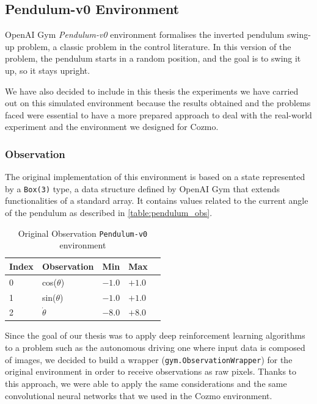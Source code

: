 \subsection{Pendulum-v0 Environment}

OpenAI Gym \textit{Pendulum-v0} environment formalises the inverted pendulum swing-up problem, a classic problem in the control literature.
In this version of the problem, the pendulum starts in a random position, and the goal is to swing it up, so it stays upright.

We have also decided to include in this thesis the experiments we have carried out on this simulated environment because the results obtained and the problems faced were essential to have a more prepared approach to deal with the real-world experiment and the environment we designed for Cozmo.


\subsubsection{Observation}

The original implementation of this environment is based on a state represented by a \texttt{Box(3)} type, a data structure defined by OpenAI Gym that extends functionalities of a standard array.
It contains values related to the current angle of the pendulum as described in \vref{table:pendulum_obs}.

\begin{table}[!h]
	\centering
	\caption{Original Observation \texttt{Pendulum-v0} environment}
	\label{table:pendulum_obs}
	\begin{tabular}{@{}lllll@{}}
		\toprule
		Index & Observation    & Min    & Max    \\ \midrule
		0     & cos($\theta$)  & $-1.0$ & $+1.0$ \\
		1     & sin($\theta$)  & $-1.0$ & $+1.0$ \\
		2     & $\dot{\theta}$ & $-8.0$ & $+8.0$ \\
		\bottomrule
	\end{tabular}
\end{table}

Since the goal of our thesis was to apply deep reinforcement learning algorithms to a problem such as the autonomous driving one where input data is composed of images, we decided to build a wrapper (\texttt{gym.ObservationWrapper}) for the original environment in order to receive observations as raw pixels.
Thanks to this approach, we were able to apply the same considerations and the same convolutional neural networks that we used in the Cozmo environment.


